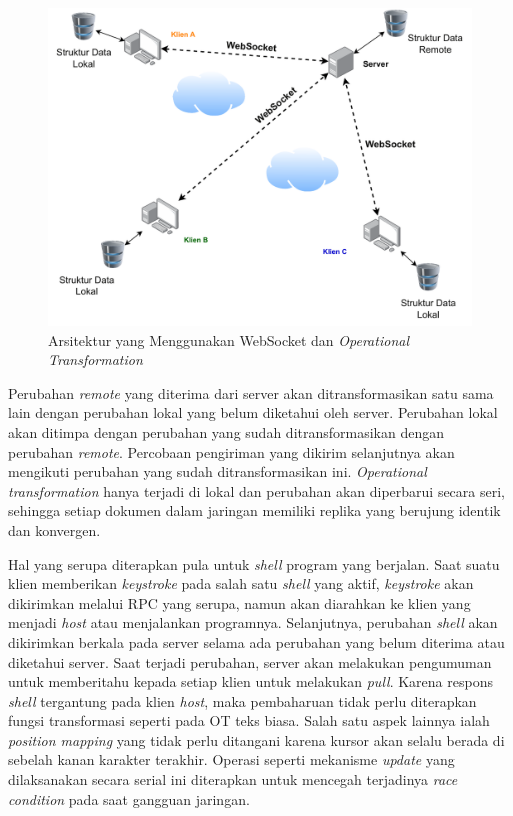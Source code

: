 \begin{figure}
    \centering
    \includegraphics[scale=0.65]{assets/skripsi/Arsitektur_WebSocket_OT}
    \caption{Arsitektur yang Menggunakan WebSocket dan \textit{Operational Transformation}}
    \label{fig:websocket_ot}
\end{figure}

Perubahan \textit{remote} yang diterima dari server akan ditransformasikan satu sama lain dengan perubahan lokal yang belum diketahui oleh server. Perubahan lokal akan ditimpa dengan perubahan yang sudah ditransformasikan dengan perubahan \textit{remote}. Percobaan pengiriman yang dikirim selanjutnya akan mengikuti perubahan yang sudah ditransformasikan ini. \textit{Operational transformation} hanya terjadi di lokal dan perubahan akan diperbarui secara seri, sehingga setiap dokumen dalam jaringan memiliki replika yang berujung identik dan konvergen.

Hal yang serupa diterapkan pula untuk \textit{shell} program yang berjalan. Saat suatu klien memberikan \textit{keystroke} pada salah satu \textit{shell} yang aktif, \textit{keystroke} akan dikirimkan melalui RPC yang serupa, namun akan diarahkan ke klien yang menjadi \textit{host} atau menjalankan programnya. Selanjutnya, perubahan \textit{shell} akan dikirimkan berkala pada server selama ada perubahan yang belum diterima atau diketahui server. Saat terjadi perubahan, server akan melakukan pengumuman untuk memberitahu kepada setiap klien untuk melakukan \textit{pull}. Karena respons \textit{shell} tergantung pada klien \textit{host}, maka pembaharuan tidak perlu diterapkan fungsi transformasi seperti pada OT teks biasa. Salah satu aspek lainnya ialah \textit{position mapping} yang tidak perlu ditangani karena kursor akan selalu berada di sebelah kanan karakter terakhir. Operasi seperti mekanisme \textit{update} yang dilaksanakan secara serial ini diterapkan untuk mencegah terjadinya \textit{race condition} pada saat gangguan jaringan.

